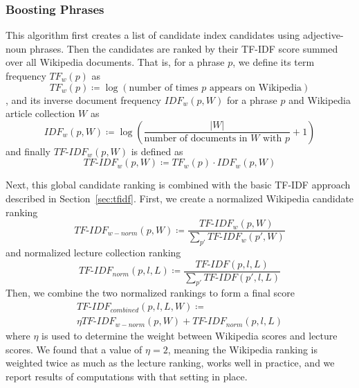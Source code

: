 \subsubsection{Boosting Phrases}

This algorithm first creates a list of candidate index candidates using adjective-noun phrases. Then the candidates are ranked by their TF-IDF score summed over all Wikipedia documents. That is, for a phrase $p$, we define its term frequency $TF_w(p)$ as
\begin{equation*}
TF_w(p) \coloneqq \log\left(\text{number of times } p \text{ appears on Wikipedia}\right)
\end{equation*},
and its inverse document frequency $IDF_w(p, W)$ for a phrase $p$ and Wikipedia article collection $W$ as
\begin{equation*}
IDF_w(p, W) \coloneqq \log\left(\frac{|W|}{\text{number of documents in } W \text{ with } p} + 1\right)
\end{equation*}
and finally $TF\text{-}IDF_w(p, W)$ is defined as
\begin{equation*}
TF\text{-}IDF_w(p, W) \coloneqq TF_w(p) \cdot IDF_w(p, W)
\end{equation*}

Next, this global candidate ranking is combined with the basic TF-IDF approach described in Section~\ref{sec:tfidf}. First, we create a normalized Wikipedia candidate ranking
\begin{equation*}
TF\text{-}IDF_{w-norm}(p, W) \coloneqq \frac{TF\text{-}IDF_w(p, W)}{\sum_{p'} TF\text{-}IDF_w(p', W)}
\end{equation*}
and normalized lecture collection ranking
\begin{equation*}
TF\text{-}IDF_{norm}(p, l, L) \coloneqq \frac{TF\text{-}IDF(p, l, L)}{\sum_{p'} TF\text{-}IDF(p', l, L)}
\end{equation*}
Then, we combine the two normalized rankings to form a final score
\begin{multline*}
TF\text{-}IDF_{combined}(p, l, L, W) \coloneqq \\ \eta TF\text{-}IDF_{w-norm}(p, W) + TF\text{-}IDF_{norm}(p, l, L)
\end{multline*}
where $\eta$ is used to determine the weight between Wikipedia scores
and lecture scores. We found that a value of $\eta = 2$, meaning the
Wikipedia ranking is weighted twice as much as the lecture ranking,
works well in practice, and we report results of computations with
that setting in place.

